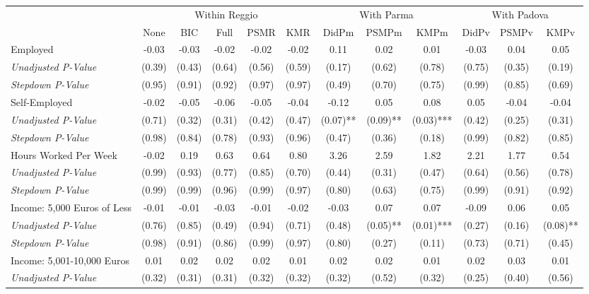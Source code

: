 \begin{tabular}{l c c c c c c c c c c c}
\toprule
& \multicolumn{5}{c}{Within Reggio} & \multicolumn{3}{c}{With Parma} & \multicolumn{3}{c}{With Padova} \\\cmidrule(lr){2-6} \cmidrule(lr){7-9} \cmidrule(lr){10-12}
 & None & BIC & Full & PSMR & KMR & DidPm & PSMPm & KMPm & DidPv & PSMPv & KMPv \\
\midrule
Employed & -0.03 & -0.03 & -0.02 & -0.02 & -0.02 & 0.11 & 0.02 & 0.01 & -0.03 & 0.04 & 0.05 \\
\quad \textit{Unadjusted P-Value} & (0.39) & (0.43) & (0.64) & (0.56) & (0.59) & (0.17) & (0.62) & (0.78) & (0.75) & (0.35) & (0.19) \\
\quad \textit{Stepdown P-Value} & (0.95) & (0.91) & (0.92) & (0.97) & (0.97) & (0.49) & (0.70) & (0.75) & (0.99) & (0.85) & (0.69) \\
Self-Employed & -0.02 & -0.05 & -0.06 & -0.05 & -0.04 & -0.12 & 0.05 & 0.08 & 0.05 & -0.04 & -0.04 \\
\quad \textit{Unadjusted P-Value} & (0.71) & (0.32) & (0.31) & (0.42) & (0.47) & (0.07)** & (0.09)** & (0.03)*** & (0.42) & (0.25) & (0.31) \\
\quad \textit{Stepdown P-Value} & (0.98) & (0.84) & (0.78) & (0.93) & (0.96) & (0.47) & (0.36) & (0.18) & (0.99) & (0.82) & (0.85) \\
Hours Worked Per Week & -0.02 & 0.19 & 0.63 & 0.64 & 0.80 & 3.26 & 2.59 & 1.82 & 2.21 & 1.77 & 0.54 \\
\quad \textit{Unadjusted P-Value} & (0.99) & (0.93) & (0.77) & (0.85) & (0.70) & (0.44) & (0.31) & (0.47) & (0.64) & (0.56) & (0.78) \\
\quad \textit{Stepdown P-Value} & (0.99) & (0.99) & (0.96) & (0.99) & (0.97) & (0.80) & (0.63) & (0.75) & (0.99) & (0.91) & (0.92) \\
Income: 5,000 Euros of Less & -0.01 & -0.01 & -0.03 & -0.01 & -0.02 & -0.03 & 0.07 & 0.07 & -0.09 & 0.06 & 0.05 \\
\quad \textit{Unadjusted P-Value} & (0.76) & (0.85) & (0.49) & (0.94) & (0.71) & (0.48) & (0.05)** & (0.01)*** & (0.27) & (0.16) & (0.08)** \\
\quad \textit{Stepdown P-Value} & (0.98) & (0.91) & (0.86) & (0.99) & (0.97) & (0.80) & (0.27) & (0.11) & (0.73) & (0.71) & (0.45) \\
Income: 5,001-10,000 Euros & 0.01 & 0.02 & 0.02 & 0.02 & 0.01 & 0.02 & 0.02 & 0.01 & 0.02 & 0.03 & 0.01 \\
\quad \textit{Unadjusted P-Value} & (0.32) & (0.31) & (0.31) & (0.32) & (0.32) & (0.32) & (0.52) & (0.32) & (0.25) & (0.40) & (0.56) \\

\end{tabular}
